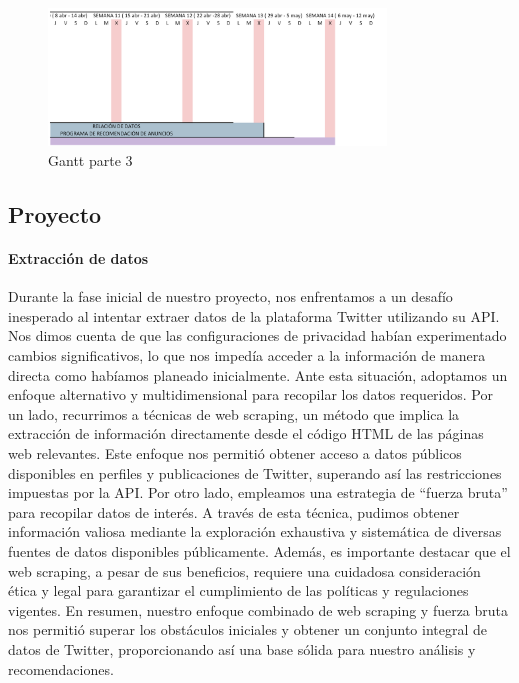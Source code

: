 \documentclass[
  letterpaper,
  DIV=11,
  numbers=noendperiod]{scrartcl}
\let\oldparagraph\paragraph
\renewcommand{\paragraph}[1]{\oldparagraph{#1}\mbox{}}
\begin{document}
\begin{figure}[htbp]
    \centering
    \includegraphics[width=0.8\textwidth, height=0.4\textheight]{gant3.png}
    \caption{Gantt parte 3}
    \label{fig:gantt3}
\end{figure}

\newpage{}

\subsection{Proyecto}\label{proyecto}

\paragraph{Extracción de datos}\label{extracciuxf3n-de-datos-1}

Durante la fase inicial de nuestro proyecto, nos enfrentamos a un
desafío inesperado al intentar extraer datos de la plataforma Twitter
utilizando su API. Nos dimos cuenta de que las configuraciones de
privacidad habían experimentado cambios significativos, lo que nos
impedía acceder a la información de manera directa como habíamos
planeado inicialmente. Ante esta situación, adoptamos un enfoque
alternativo y multidimensional para recopilar los datos requeridos. Por
un lado, recurrimos a técnicas de web scraping, un método que implica la
extracción de información directamente desde el código HTML de las
páginas web relevantes. Este enfoque nos permitió obtener acceso a datos
públicos disponibles en perfiles y publicaciones de Twitter, superando
así las restricciones impuestas por la API. Por otro lado, empleamos una
estrategia de ``fuerza bruta'' para recopilar datos de interés. A través
de esta técnica, pudimos obtener información valiosa mediante la
exploración exhaustiva y sistemática de diversas fuentes de datos
disponibles públicamente. Además, es importante destacar que el web
scraping, a pesar de sus beneficios, requiere una cuidadosa
consideración ética y legal para garantizar el cumplimiento de las
políticas y regulaciones vigentes. En resumen, nuestro enfoque combinado
de web scraping y fuerza bruta nos permitió superar los obstáculos
iniciales y obtener un conjunto integral de datos de Twitter,
proporcionando así una base sólida para nuestro análisis y
recomendaciones.
\end{document}
